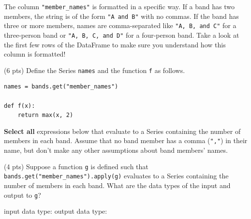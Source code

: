 \documentclass[twoside,12pt]{article}
\begin{document}
\begin{probset}

\begin{prob}[(14 pts)]
The column \verb|"member_names"| is formatted in a specific way. If a band has two members, the string is of the form \texttt{"A and B"} with no commas. If the band has three or more members, names are comma-separated like \texttt{"A, B, and C"} for a three-person band or \texttt{"A, B, C, and D"} for a four-person band. Take a look at the first few rows of the DataFrame to make sure you understand how this column is formatted!

\begin{subprobset}
    \begin{subprob}(6 pts)
Define the Series \texttt{names} and the function \texttt{f} as follows.

\begin{verbatim}
names = bands.get("member_names")

def f(x):
    return max(x, 2)
\end{verbatim}

\textbf{Select all} expressions below that evaluate to a Series containing the number of members in each band. Assume that no band member has a comma (\texttt{","}) in their name, but don't make any other assumptions about band members' names.

\smallskip
{} 

\smallskip
{} 

\smallskip
{} 

\smallskip
{} 

\smallskip
{} 

    \end{subprob}

\bigskip

\begin{subprob}(4 pts) Suppose a function \texttt{g} is defined such that \texttt{bands.get("member\_names").apply(g)} evaluates to a Series containing the number of members in each band. What are the data types of the input and output to \texttt{g}?

\smallskip

\begin{center}    
input data type: 
\qquad
output data type:
\end{center}
\end{subprob}


\end{subprobset}
\end{prob}
\end{probset}
\end{document}
